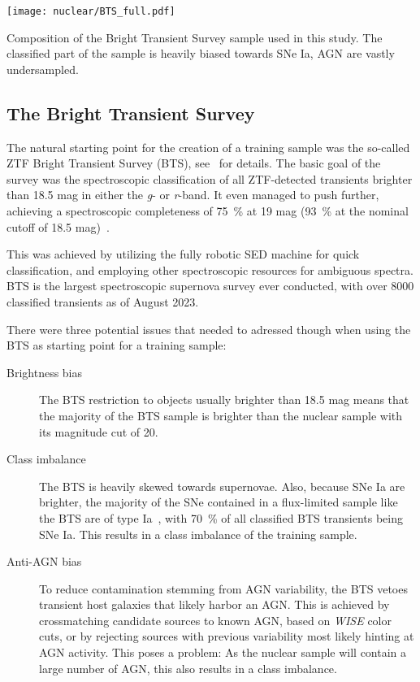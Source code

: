 \begin{marginfigure}
  \texttt{[image: nuclear/BTS\_full.pdf]}
  \caption[BTS Composition]{Composition of the Bright Transient Survey sample used in this study. The classified part of the sample is heavily biased towards SNe Ia, AGN are vastly undersampled.}
\end{marginfigure}

\subsection{The Bright Transient Survey}\label{bts}
The natural starting point for the creation of a training sample was the so-called ZTF Bright Transient Survey (BTS), see~\cite{Fremling2020,Perley2020} for details. The basic goal of the survey was the spectroscopic classification of all ZTF-detected transients brighter than 18.5 mag in either the \textit{g}- or \textit{r}-band. It even managed to push further, achieving a spectroscopic completeness of \SI{75}{\percent} at 19 mag (\SI{93}{\percent} at the nominal cutoff of 18.5 mag)~\cite{Perley2020}.

This was achieved by utilizing the fully robotic SED machine for quick classification, and employing other spectroscopic resources for ambiguous spectra. BTS is the largest spectroscopic supernova survey ever conducted, with over 8000 classified transients as of August 2023.

There were three potential issues that needed to adressed though when using the BTS as starting point for a training sample:

\begin{description}
  \item[Brightness bias] The BTS restriction to objects usually brighter than 18.5 mag means that the majority of the BTS sample is brighter than the nuclear sample with its magnitude cut of 20.
  \item[Class imbalance] The BTS is heavily skewed towards supernovae. Also, because SNe Ia are brighter, the majority of the SNe contained in a flux-limited sample like the BTS are of type Ia~\cite{Perley2020}, with \SI{70}{\percent} of all classified BTS transients being SNe Ia. This results in a class imbalance of the training sample.
  \item[Anti-AGN bias] To reduce contamination stemming from AGN variability, the BTS vetoes transient host galaxies that likely harbor an AGN. This is achieved by crossmatching candidate sources to known AGN, based on \textit{WISE} color cuts, or by rejecting sources with previous variability most likely hinting at AGN activity. This poses a problem: As the nuclear sample will contain a large number of AGN, this also results in a class imbalance.
\end{description}

